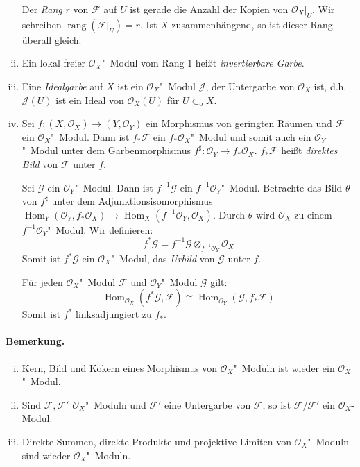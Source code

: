 \documentclass[11pt,b5paper,openany]{memoir}
\begin{document}
\begin{enumerate}[(i)]
Der \textit{Rang} $r$ von $\mathcal{F}$ auf $U$ ist gerade die Anzahl der Kopien von $\mathcal{O}_X|_U$. Wir schreiben $\operatorname{rang}(\mathcal{F}|_U)=r$. Ist $X$ zusammenhängend, so ist dieser Rang überall gleich. 
\item Ein lokal freier $\mathcal{O}_X$"~Modul vom Rang $1$ heißt \textit{invertierbare Garbe}.
\item Eine \textit{Idealgarbe} auf $X$ ist ein $\mathcal{O}_X$"~Modul $\mathcal{J}$, der Untergarbe von $\mathcal{O}_X$ ist, d.h. $\mathcal{J}(U)$ ist ein Ideal von $\mathcal{O}_X(U)$ für $U\subset_\text{o}X$.
\item Sei $f:(X,\mathcal{O}_X)\to (Y,\mathcal{O}_Y)$ ein Morphismus von geringten Räumen und $\mathcal{F}$ ein $\mathcal{O}_X$"~Modul. Dann ist $f_\ast\mathcal{F}$ ein $f_\ast\mathcal{O}_X$"~Modul und somit auch ein $\mathcal{O}_Y$"~Modul unter dem Garbenmorphismus $f^\sharp:\mathcal{O}_Y\to f_\ast\mathcal{O}_X$. $f_\ast\mathcal{F}$ heißt \textit{direktes Bild} von $\mathcal{F}$ unter $f$.

Sei $\mathcal{G}$ ein $\mathcal{O}_Y$"~Modul. Dann ist $f^{-1}\mathcal{G}$ ein $f^{-1}\mathcal{O}_Y$"~Modul. Betrachte das Bild $\theta$ von $f^\sharp$ unter dem Adjunktionsisomorphismus $\operatorname{Hom}_Y(\mathcal{O}_Y,f_\ast\mathcal{O}_X)\to\operatorname{Hom}_X(f^{-1}\mathcal{O}_Y,\mathcal{O}_X)$. Durch $\theta$ wird $\mathcal{O}_X$ zu einem $f^{-1}\mathcal{O}_Y$"~Modul. Wir definieren: 
\[f^\ast\mathcal{G}= f^{-1}\mathcal{G}\otimes_{f^{-1}\mathcal{O}_Y}\mathcal{O}_X\]
Somit ist $f^\ast\mathcal{G}$ ein $\mathcal{O}_X$"~Modul, das \textit{Urbild} von $\mathcal{G}$ unter $f$. 

Für jeden $\mathcal{O}_X$"~Modul $\mathcal{F}$ und $\mathcal{O}_Y$"~Modul $\mathcal{G}$ gilt:
\[\operatorname{Hom}_{\mathcal{O}_X}(f^\ast\mathcal{G},\mathcal{F})\cong\operatorname{Hom}_{\mathcal{O}_Y}(\mathcal{G},f_\ast\mathcal{F}) \]
Somit ist $f^\ast$ linksadjungiert zu $f_\ast$.
\end{enumerate}

\paragraph{Bemerkung.}\begin{enumerate}[(i)]
\item Kern, Bild und Kokern eines Morphismus von $\mathcal{O}_X$"~Moduln ist wieder ein $\mathcal{O}_X$"~Modul.
\item Sind $\mathcal{F},\mathcal{F}'$ $\mathcal{O}_X$"~Moduln und $\mathcal{F}'$ eine Untergarbe von $\mathcal{F}$, so ist $\mathcal{F}/\mathcal{F}'$ ein $\mathcal{O}_X$-Modul.
\item Direkte Summen, direkte Produkte und projektive Limiten von $\mathcal{O}_X$"~Moduln sind wieder $\mathcal{O}_X$"~Moduln.
\end{enumerate}
\end{document}
